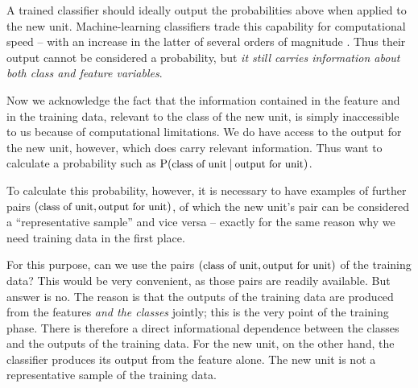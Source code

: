 \documentclass[\ifafour a4paper,12pt,\else a5paper,10pt,\fi%
onecolumn,oneside,article,%
british%
]{memoir}
\theoremstyle{remark}
\theoremstyle{innote}
\renewcommand*{\P}{\mathrm{P}}%
\renewcommand*{\|}[1][]{\nonscript\:#1\vert\nonscript\:\mathopen{}}
\newcommand*{\sect}{\S}%
\newcommand*{\eg}{{e.g.}}
\newcommand*{\texts}[1]{\text{\small #1}}
\begin{document}
A trained classifier should ideally output the probabilities above when applied to the new unit. Machine-learning classifiers trade this capability for computational speed -- with an increase in the latter of several orders of magnitude \autocites[to understand this trade-off in the case of neural-network classifiers see \eg][]{mackay1992,mackay1992b,mackay1992d}[\sect~16.5 esp.~16.5.7]{murphy2012}[see also the discussion by][]{selfetal1987}. Thus their output cannot be considered a probability, but \emph{it still carries information about both class and feature variables}.


Now we acknowledge the fact that the information contained in the feature and in the training data, relevant to the class of the new unit, is simply inaccessible to us because of computational limitations. We do have access to the output for the new unit, however, which does carry relevant information. Thus want to calculate a probability such as $\P(\texts{class of unit} \| \texts{output for unit})$.

To calculate this probability, however, it is necessary to have examples of further pairs $(\texts{class of unit}, \texts{output for unit})$, of which the new unit's pair can be considered a \enquote{representative sample} \autocites[for a critical analysis of the sometimes hollow term \enquote{representative sample} see][]{kruskaletal1979,kruskaletal1979b,kruskaletal1979c,kruskaletal1980} and vice versa -- exactly for the same reason why we need training data in the first place.

For this purpose, can we use the pairs $(\texts{class of unit}, \texts{output for unit})$ of the training data? This would be very convenient, as those pairs are readily available. But answer is no. The reason is that the outputs of the training data are produced from the features \emph{and the classes} jointly; this is the very point of the training phase. There is therefore a direct informational dependence between the classes and the outputs of the training data. For the new unit, on the other hand, the classifier produces its output from the feature alone. The new unit is not a representative sample of the training data.
\end{document}
